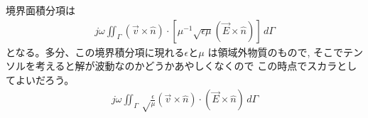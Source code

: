 境界面積分項は
\begin{align}
j\omega\iint_\Gamma
\left(\vec{v}\times\hat{n}\right)\cdot
\left[\mu^{-1}
\sqrt{\epsilon\mu}\left(\vec{E}\times\hat{n}\right)
\right]\,d\Gamma
\end{align}
となる。多分、この境界積分項に現れる$\epsilon$と$\mu$
は領域外物質のもので,
そこでテンソルを考えると解が波動なのかどうかあやしくなくので%
この時点でスカラとしてよいだろう。
\begin{align}
j\omega\iint_\Gamma\sqrt\frac{\epsilon}{\mu}
\left(\vec{v}\times\hat{n}\right)\cdot
\left(\vec{E}\times\hat{n}\right)
\,d\Gamma
\end{align}
